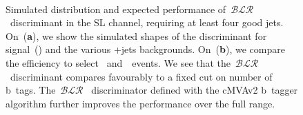 \begin{figure}
\begin{centering}
\\
\caption[Expected performance of the b~tag likelihood ratio discriminant.]{Simulated distribution and expected performance of~$\mathcal{BLR}$~discriminant in the SL channel, requiring at least four good jets. On~(\textbf{a}), we show the simulated shapes of the discriminant for signal~(\ttHbb) and the various \ttbar+jets backgrounds. On~(\textbf{b}), we compare the efficiency to select~\ttHbb\xspace and~\ttlf~events. We see that the~$\mathcal{BLR}$~discriminant compares favourably to a fixed cut on number of b~tags. The~$\mathcal{BLR}$~ discriminator defined with the cMVAv2 b~tagger algorithm further improves the performance over the full range.}
\label{fig:blr_discrimination}
\end{centering}
\end{figure}



